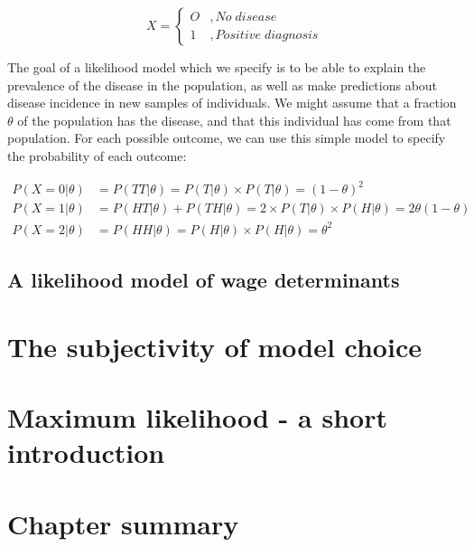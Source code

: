 \documentclass[11pt,fullpage]{book}
\begin{document}
\begin{equation}
X =
\begin{cases}
O & , No\; disease \\
1 & , Positive \; diagnosis
\end{cases}
\end{equation}

The goal of a likelihood model which we specify is to be able to explain the prevalence of the disease in the population, as well as make predictions about disease incidence in new samples of individuals. We might assume that a fraction $\theta$ of the population has the disease, and that this individual has come from that population. For each possible outcome, we can use this simple model to specify the probability of each outcome:

\begin{align}\label{eq:Likelihood_SimpleModel}
P(X = 0|\theta)& = P(TT|\theta) = P(T|\theta)\times P(T|\theta) = (1-\theta)^2\\
P(X = 1|\theta)& = P(HT|\theta) + P(TH|\theta) = 2\times P(T|\theta)\times P(H|\theta) = 2\theta(1-\theta)\\
P(X = 2|\theta)& = P(HH|\theta) = P(H|\theta)\times P(H|\theta) = \theta^2
\end{align}


\subsection{A likelihood model of wage determinants}


\section{The subjectivity of model choice}
\section{Maximum likelihood - a short introduction}
\section{Chapter summary}




\end{document}
